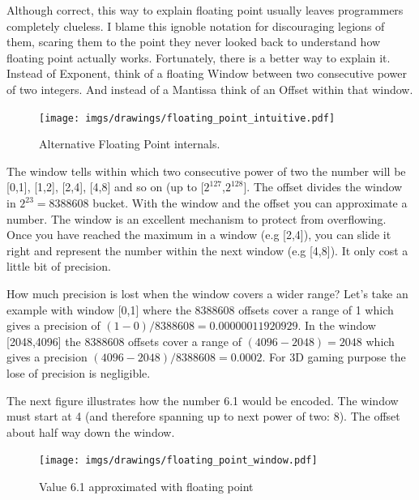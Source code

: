 \documentclass[book.tex]{subfiles}
\begin{document}
Although correct, this way to explain floating point usually leaves programmers completely clueless. I blame this ignoble notation for discouraging legions of them, scaring them to the point they never looked back to understand how floating point actually works. Fortunately, there is a better way to explain it. Instead of Exponent, think of a floating Window between two consecutive power of two integers. And instead of a Mantissa think of an Offset within that window.\\ 
\par
  
\begin{figure}[H]
\centering
\texttt{[image: imgs/drawings/floating\_point\_intuitive.pdf]}
\caption{Alternative Floating Point internals.}
\end{figure}
  \bigskip  
The window tells within which two consecutive power of two the number will be [0,1], [1,2], [2,4], [4,8] and so on (up to [$2^{127}$,$2^{128}$]. The offset divides the window in $ 2^{23} = 8388608 $  bucket. With the window and the offset you can approximate a number. The window is an excellent mechanism to protect from overflowing. Once you have reached the maximum in a window (e.g [2,4]), you can slide it right and represent the number within the next window (e.g [4,8]). It only cost a little bit of precision.\\


\par {} How much precision is lost when the window covers a wider range? Let's take an example with window [0,1] where the 8388608 offsets cover a range of 1 which gives a precision of $(1-0)/8388608=0.00000011920929$. In the window [2048,4096] the 8388608 offsets cover a range of $(4096-2048) = 2048$ which gives a precision $ (4096-2048)/8388608=0.0002$. For 3D gaming purpose the lose of precision is negligible.\\
\par

The next figure illustrates how the number 6.1 would be encoded. The window must start at 4 (and therefore spanning up to next power of two: 8). The offset about half way down the window.

\begin{figure}[H]
\centering
\texttt{[image: imgs/drawings/floating\_point\_window.pdf]}

\caption{Value 6.1 approximated with floating point}
\label{fig:fp_internals_window6_1}
\end{figure}
  \bigskip
  
\end{document}
